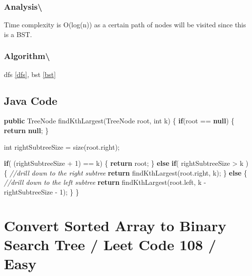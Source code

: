 \documentclass[]{book}
\newenvironment{Shaded}{\begin{snugshade}}{\end{snugshade}}
\newcommand{\BuiltInTok}[1]{#1}
\newcommand{\CommentTok}[1]{\textcolor[rgb]{0.56,0.35,0.01}{\textit{#1}}}
\newcommand{\DataTypeTok}[1]{\textcolor[rgb]{0.13,0.29,0.53}{#1}}
\newcommand{\DecValTok}[1]{\textcolor[rgb]{0.00,0.00,0.81}{#1}}
\newcommand{\FunctionTok}[1]{\textcolor[rgb]{0.00,0.00,0.00}{#1}}
\newcommand{\KeywordTok}[1]{\textcolor[rgb]{0.13,0.29,0.53}{\textbf{#1}}}
\newcommand{\NormalTok}[1]{#1}
\begin{document}
\hypertarget{analysis-94}{%
\subsubsection{Analysis\textbackslash{}}\label{analysis-94}}

Time complexity is O(log(n)) as a certain path of nodes will be visited since this is a BST.

\hypertarget{algorithm-96}{%
\subsubsection{Algorithm\textbackslash{}}\label{algorithm-96}}

dfs \ref{dfs}, bst \ref{bst}

\hypertarget{java-code-57}{%
\subsection{Java Code}\label{java-code-57}}

\begin{Shaded}
\begin{Highlighting}[]
\KeywordTok{public} \BuiltInTok{TreeNode} \FunctionTok{findKthLargest}\NormalTok{(}\BuiltInTok{TreeNode}\NormalTok{ root, }\DataTypeTok{int}\NormalTok{ k) \{}
    \KeywordTok{if}\NormalTok{(root == }\KeywordTok{null}\NormalTok{) \{}
        \KeywordTok{return} \KeywordTok{null}\NormalTok{;}
\NormalTok{    \}}

    \DataTypeTok{int}\NormalTok{ rightSubtreeSize = }\FunctionTok{size}\NormalTok{(root.}\FunctionTok{right}\NormalTok{);}

    \KeywordTok{if}\NormalTok{( (rightSubtreeSize + }\DecValTok{1}\NormalTok{) == k) \{}
        \KeywordTok{return}\NormalTok{ root;}
\NormalTok{    \} }\KeywordTok{else} \KeywordTok{if}\NormalTok{( rightSubtreeSize > k ) \{}
        \CommentTok{//drill down to the right subtree}
        \KeywordTok{return} \FunctionTok{findKthLargest}\NormalTok{(root.}\FunctionTok{right}\NormalTok{, k);}
\NormalTok{    \} }\KeywordTok{else}\NormalTok{ \{}
        \CommentTok{//drill down to the left subtree}
        \KeywordTok{return} \FunctionTok{findKthLargest}\NormalTok{(root.}\FunctionTok{left}\NormalTok{, k - rightSubtreeSize - }\DecValTok{1}\NormalTok{);}
\NormalTok{    \}}
\NormalTok{\}}
\end{Highlighting}
\end{Shaded}

\hypertarget{convert-sorted-array-to-binary-search-tree-leet-code-108-easy}{%
\section{Convert Sorted Array to Binary Search Tree / Leet Code 108 / Easy}\label{convert-sorted-array-to-binary-search-tree-leet-code-108-easy}}
\end{document}
